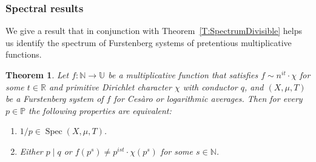 \documentclass[11pt]{amsart}
\newtheorem{theorem}[lemma]{Theorem}
\theoremstyle{definition}
\newcommand{\N}{{\mathbb N}}
\renewcommand{\P}{{\mathbb P}}
\newcommand{\R}{{\mathbb R}}
\newcommand{\U}{{\mathbb U}}
\DeclareMathOperator{\spec}{Spec}
\begin{document}
\subsubsection{Spectral results}\label{SS}
We give a  result  that in conjunction with Theorem~\ref{T:SpectrumDivisible} helps us identify the spectrum of Furstenberg systems  of pretentious  multiplicative functions.
 \begin{theorem}\label{T:spectrum}
	Let  $f\colon \N\to \U$  be a multiplicative function that
	satisfies $f\sim n^{it} \cdot \chi$ for some  $t\in \R$ and  primitive Dirichlet character $\chi$ with conductor $q$, and  $(X,\mu,T)$ be a Furstenberg system of $f$ for Ces\`aro or logarithmic averages. Then for every $p\in \P$ the following properties are equivalent:
	\begin{enumerate}
		\item \label{I:spectrum1} $1/p \in \spec(X,\mu,T)$.
		
		\smallskip
		
		\item \label{I:spectrum2}  Either $p\mid q$ or $f(p^s)\neq p^{ist}\cdot \chi(p^s)$ for some $s\in\N$.
\end{enumerate}
		
\end{theorem}
 	
\end{document}
